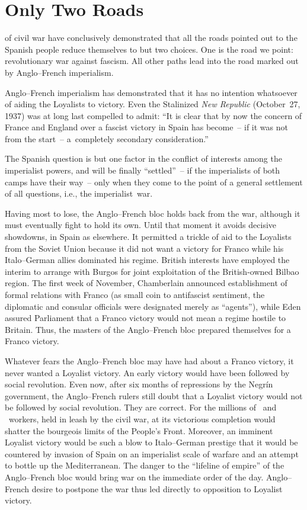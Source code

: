 \chapter{Only Two Roads}

 of civil war have conclusively demonstrated that all the roads pointed out to the Spanish people reduce themselves to but two choices. One is the road we point: revolutionary war against fascism. All other paths lead into the road marked out by Anglo--French imperialism.

Anglo--French imperialism has demonstrated that it has no intention whatsoever of aiding the Loyalists to victory. Even the Stalinized \emph{New Republic} (October~27, 1937) was at long last compelled to admit: ``It is clear that by now the concern of France and England over a fascist victory in Spain has become~-- if it was not from the start~-- a~completely secondary consideration.\kn\kn''

The Spanish question is but one factor in the conflict of interests among the imperialist powers, and will be finally ``settled''~-- if the imperialists of both camps have their way~-- only when they come to the point of a general settlement of all questions, i.e., the imperialist~war.

Having most to lose, the Anglo--French bloc holds back from the war, although it must eventually fight to hold its own. Until that moment it avoids decisive showdowns, in Spain as elsewhere. It permitted a trickle of aid to the Loyalists from the Soviet Union because it did not want a victory for Franco while his Italo--German allies dominated his regime. British interests have employed the interim to arrange with Burgos for joint exploitation of the British-owned Bilbao region. The first week of November, Chamberlain announced establishment of formal relations with Franco (as small coin to antifascist sentiment, the diplomatic and consular officials were designated merely as ``agents''), while Eden assured Parliament that a Franco victory would not mean a regime hostile to Britain. Thus, the masters of the Anglo--French bloc prepared themselves for a Franco victory.

Whatever fears the Anglo--French bloc may have had about a Fran\-co victory, it never wanted a Loyalist victory. An early victory would have been followed by social revolution. Even now, after six months of repressions by the Negr\'in government, the Anglo--French rulers still doubt that a Loyalist victory would not be followed by social revolution. They are correct. For the millions of \CNT\ and \UGT\ workers, held in leash by the civil war, at its victorious completion would shatter the bourgeois limits of the People’s Front. Moreover, an imminent Loyalist victory would be such a blow to Italo--German prestige that it would be countered by invasion of Spain on an imperialist scale of warfare and an attempt to bottle up the Mediterranean. The danger to the ``lifeline of empire'' of the Anglo--French bloc would bring war on the immediate order of the day. Anglo--French desire to postpone the war thus led directly to opposition to Loyalist victory.

